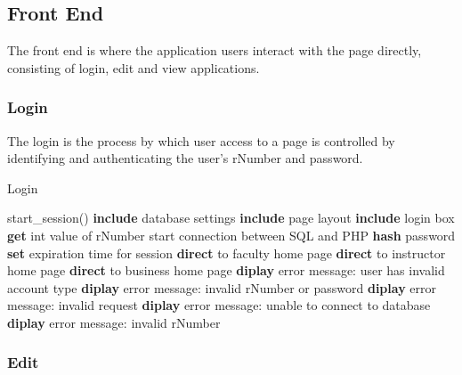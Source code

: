 	
	\subsection{Front End}
	The front end is where the application users interact with the page directly, consisting of login, edit and view applications.
		
		\subsubsection{Login}
		The login is the process by which user access to a page is controlled by identifying and authenticating the user's rNumber and password. 
		
		\begin{algorithm}[H]
			\caption{Login}
			\begin{algorithmic}[1]
			\State start\_session()
			\State \textbf{include} database settings
			\State \textbf{include} page layout
			\State \textbf{include} login box
				\State \textbf{get} int value of rNumber
				\State start connection between SQL and PHP
					\State \textbf{hash} password
					 	\State \textbf{set} expiration time for session
					 		\State \textbf{direct} to faculty home page 
					 		\State \textbf{direct} to instructor home page 
					 		\State \textbf{direct} to business home page
					 		\Else
					 		\State \textbf{diplay} error message: user has invalid account type
					 		\EndIf 	
					 	\Else
					 	\State \textbf{diplay} error message: invalid rNumber or password
					 	\EndIf 
					\Else
				 	\State \textbf{diplay} error message: invalid request
				 	\EndIf 
				\Else
			 	\State \textbf{diplay} error message: unable to connect to database	
				\EndIf
			\Else
			\State \textbf{diplay} error message: invalid rNumber	
			\EndIf			
		\end{algorithmic} 
		\end{algorithm}
		
		\subsubsection{Edit}
		
